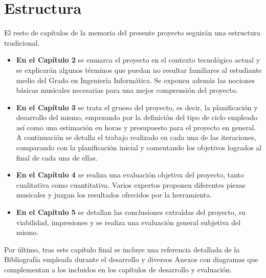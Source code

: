  \section{Estructura}
  \label{sec:project_structure}
 El resto de capítulos de la memoria del presente proyecto seguirán una estructura tradicional. 
 \begin{itemize}
 	\item \textbf{En el Capítulo 2} se enmarca el proyecto en el contexto tecnológico actual y se explicarán algunos términos que puedan no resultar familiares al estudiante medio del Grado en Ingeniería Informática. Se exponen además las nociones básicas musicales necesarias para una mejor comprensión del proyecto.
 	\item \textbf{En el Capítulo 3} se trata el grueso del proyecto, es decir, la planificación y desarrollo del mismo, empezando por la definición del tipo de ciclo empleado así como una estimación en horas y presupuesto para el proyecto en general. A continuación se detalla el trabajo realizado en cada una de las iteraciones, comparando con la planificación inicial y comentando los objetivos logrados al final de cada una de ellas.
  	\item \textbf{En el Capítulo 4} se realiza una evaluación objetiva del proyecto, tanto cualitativa como cuantitativa. Varios expertos proponen diferentes piezas musicales y juzgan los resultados ofrecidos por la herramienta.
 	\item \textbf{En el Capítulo 5} se detallan las conclusiones extraídas del proyecto, su viabilidad, impresiones y se realiza una evaluación general subjetiva del mismo.
 \end{itemize}
 Por último, tras este capítulo final se incluye una referencia detallada de la Bibliografía empleada durante el desarrollo y diversos Anexos con diagramas que complementan a los incluidos en los capítulos de desarrollo y evaluación.
 
